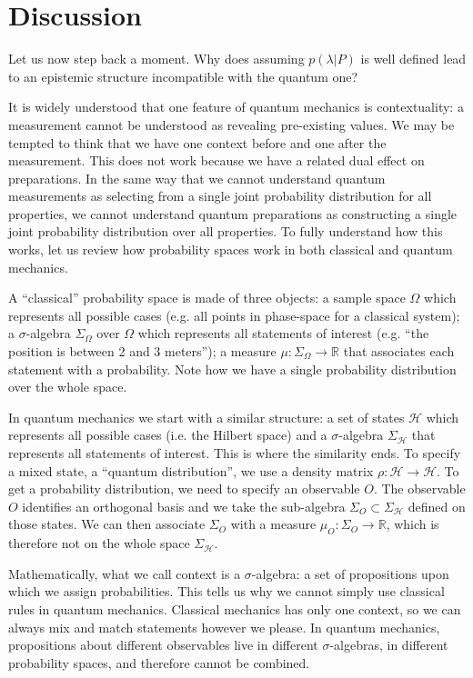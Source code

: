 \documentclass[twocolumn,prl,floatfix,superscriptaddress]{revtex4-2}
\begin{document}
\section{Discussion}

Let us now step back a moment. Why does assuming $p(\lambda|P)$ is well defined lead to an epistemic structure incompatible with the quantum one?

It is widely understood that one feature of quantum mechanics is contextuality: a measurement cannot be understood as revealing pre-existing values. We may be tempted to think that we have one context before and one after the measurement. This does not work because we have a related dual effect on preparations. In the same way that we cannot understand quantum measurements as selecting from a single joint probability distribution for all properties, we cannot understand quantum preparations as constructing a single joint probability distribution over all properties. To fully understand how this works, let us review how probability spaces work in both classical and quantum mechanics.

A ``classical'' probability space is made of three objects: a sample space $\Omega$ which represents all possible cases (e.g. all points in phase-space for a classical system); a $\sigma$-algebra $\Sigma_\Omega$ over $\Omega$ which represents all statements of interest (e.g. ``the position is between 2 and 3 meters''); a measure $\mu : \Sigma_\Omega \to \mathbb{R}$ that associates each statement with a probability. Note how we have a single probability distribution over the whole space.

In quantum mechanics we start with a similar structure: a set of states $\mathcal{H}$ which represents all possible cases (i.e. the Hilbert space) and a $\sigma$-algebra $\Sigma_{\mathcal{H}}$ that represents all statements of interest. This is where the similarity ends. To specify a mixed state, a ``quantum distribution'', we use a density matrix $\rho : \mathcal{H} \to \mathcal{H}$. To get a probability distribution, we need to specify an observable $O$. The observable $O$ identifies an orthogonal basis and we take the sub-algebra $\Sigma_O \subset \Sigma_{\mathcal{H}}$ defined on those states. We can then associate $\Sigma_O$ with a measure $\mu_O : \Sigma_O \to \mathbb{R}$, which is therefore not on the whole space $\Sigma_{\mathcal{H}}$.

Mathematically, what we call context is a $\sigma$-algebra: a set of propositions upon which we assign probabilities. This tells us why we cannot simply use classical rules in quantum mechanics. Classical mechanics has only one context, so we can always mix and match statements however we please. In quantum mechanics, propositions about different observables live in different $\sigma$-algebras, in different probability spaces, and therefore cannot be combined.
\end{document}

